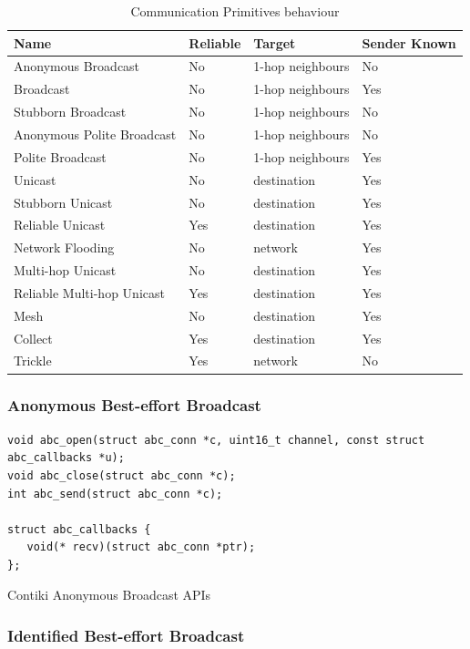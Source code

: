 \begin{table}[H]
	\centering
	\begin{tabular}{ | l | l | l | l | }
		\hline
		Name & Reliable & Target & Sender Known\\
		\hline
		Anonymous Broadcast & No & 1-hop neighbours & No\\
		Broadcast & No & 1-hop neighbours & Yes\\
		Stubborn Broadcast & No & 1-hop neighbours & No\\
		Anonymous Polite Broadcast & No & 1-hop neighbours & No\\
		Polite Broadcast & No & 1-hop neighbours & Yes\\
		Unicast & No & destination & Yes\\
		Stubborn Unicast & No & destination & Yes\\
		Reliable Unicast & Yes & destination & Yes\\
		Network Flooding & No & network & Yes\\
		Multi-hop Unicast & No & destination & Yes\\
		Reliable Multi-hop Unicast & Yes & destination & Yes\\
		\hline
		\hline
		Mesh & No & destination & Yes \\
		Collect & Yes & destination & Yes \\
		Trickle & Yes & network & No \\
		\hline
	\end{tabular}
	\caption{Communication Primitives behaviour}
\end{table}

\subsubsection{Anonymous Best-effort Broadcast}

\begin{listing}[H]
\begin{verbatim}
void abc_open(struct abc_conn *c, uint16_t channel, const struct abc_callbacks *u);
void abc_close(struct abc_conn *c);
int abc_send(struct abc_conn *c);

struct abc_callbacks {
   void(* recv)(struct abc_conn *ptr);
};
\end{verbatim}
\caption{Contiki Anonymous Broadcast APIs}
\end{listing}

\subsubsection{Identified Best-effort Broadcast}

